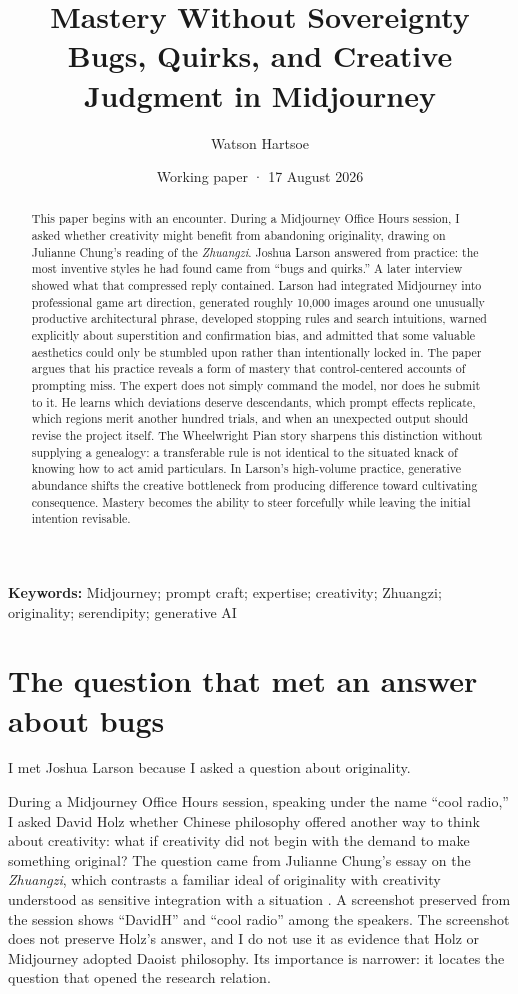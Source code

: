 \documentclass[11pt]{article}
\title{Mastery Without Sovereignty\\\large Bugs, Quirks, and Creative Judgment in Midjourney}
\author{Watson Hartsoe}
\date{Working paper · 17 August 2026}
\begin{document}
\maketitle
\thispagestyle{firstpage}
\begin{abstract}
This paper begins with an encounter. During a Midjourney Office Hours session, I asked whether creativity might benefit from abandoning originality, drawing on Julianne Chung's reading of the \emph{Zhuangzi}. Joshua Larson answered from practice: the most inventive styles he had found came from ``bugs and quirks.'' A later interview showed what that compressed reply contained. Larson had integrated Midjourney into professional game art direction, generated roughly 10,000 images around one unusually productive architectural phrase, developed stopping rules and search intuitions, warned explicitly about superstition and confirmation bias, and admitted that some valuable aesthetics could only be stumbled upon rather than intentionally locked in. The paper argues that his practice reveals a form of mastery that control-centered accounts of prompting miss. The expert does not simply command the model, nor does he submit to it. He learns which deviations deserve descendants, which prompt effects replicate, which regions merit another hundred trials, and when an unexpected output should revise the project itself. The Wheelwright Pian story sharpens this distinction without supplying a genealogy: a transferable rule is not identical to the situated knack of knowing how to act amid particulars. In Larson's high-volume practice, generative abundance shifts the creative bottleneck from producing difference toward cultivating consequence. Mastery becomes the ability to steer forcefully while leaving the initial intention revisable.
\end{abstract}
\textbf{Keywords:} Midjourney; prompt craft; expertise; creativity; Zhuangzi; originality; serendipity; generative AI

\section{The question that met an answer about bugs}
I met Joshua Larson because I asked a question about originality.

During a Midjourney Office Hours session, speaking under the name ``cool radio,'' I asked David Holz whether Chinese philosophy offered another way to think about creativity: what if creativity did not begin with the demand to make something original? The question came from Julianne Chung's essay on the \emph{Zhuangzi}, which contrasts a familiar ideal of originality with creativity understood as sensitive integration with a situation \cite{Chung2020Originality}. A screenshot preserved from the session shows ``DavidH'' and ``cool radio'' among the speakers. The screenshot does not preserve Holz's answer, and I do not use it as evidence that Holz or Midjourney adopted Daoist philosophy. Its importance is narrower: it locates the question that opened the research relation.
\end{document}
